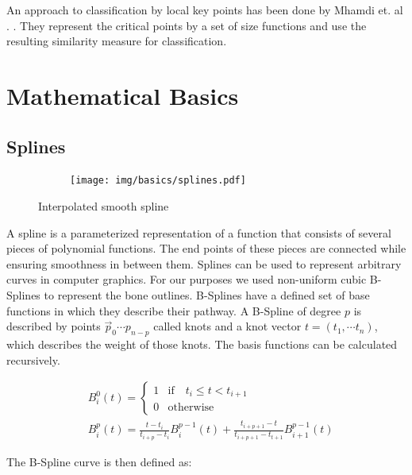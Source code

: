 \documentclass[pdftex,12pt,a4paper]{report}
\begin{document}
An approach to classification by local key points has been done by Mhamdi et. al . \cite{mhamdi2014local}. They represent the critical points by a set of size functions and use the resulting similarity measure for classification.

\chapter{Mathematical Basics}

\section{Splines}
\label{section:splines}

\begin{figure}[h]
	\centering
	\begin{subfigure}[b]{0.3\textwidth}
		\centering
		\texttt{[image: img/basics/splines.pdf]}
	\end{subfigure}
	\caption{Interpolated smooth spline}
	\label{fig:basics-splines}
\end{figure}

A spline is a parameterized representation of a function that consists of several pieces of polynomial functions. The end points of these pieces are connected while ensuring smoothness in between them. Splines can be used to represent arbitrary curves in computer graphics. For our purposes we used non-uniform cubic B-Splines to represent the bone outlines. B-Splines have a defined set of base functions in which they describe their pathway. A B-Spline of degree $p$ is described by points $\vec{p}_0 \cdots p_{n-p}$ called knots and a knot vector $t = (t_1, \cdots t_{n})$, which describes the weight of those knots. The basis functions can be calculated recursively.

\begin{equation}
\begin{split}
& B_i^0(t) = \left\{
\begin{matrix} 
1 & \mathrm{if} \quad t_i \leq t < t_{i+1} \\
0 & \mathrm{otherwise} 
\end{matrix} \right. \\
& B_i^p(t) = \frac{t - t_i}{t_{i+p} - t_i} B_i^{p-1}(t) + \frac{t_{i+p+1} - t}{t_{i+p+1} - t_{t+1}} B_{i+1}^{p-1}(t)
\end{split} 
\end{equation}

The B-Spline curve is then defined as:
\end{document}
